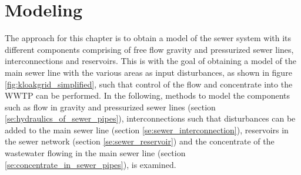 \chapter{Modeling}\label{se:modeling}

The approach for this chapter is to obtain a model of the sewer system with its different components comprising of free flow gravity and pressurized sewer lines, interconnections and reservoirs. 
This is with the goal of obtaining a model of the main sewer line with the various areas as input disturbances, as shown in figure \ref{fig:kloakgrid_simplified}, such that control of the flow and concentrate into the WWTP can be performed. 
In the following, methods to model the components such as flow in gravity and pressurized sewer lines (section \ref{se:hydraulics_of_sewer_pipes}), interconnections such that disturbances can be added to the main sewer line (section \ref{se:sewer_interconnection}), reservoirs in the sewer network (section \ref{se:sewer_reservoir}) and the concentrate of the wastewater flowing in the main sewer line (section \ref{se:concentrate_in_sewer_pipes}), is examined.








